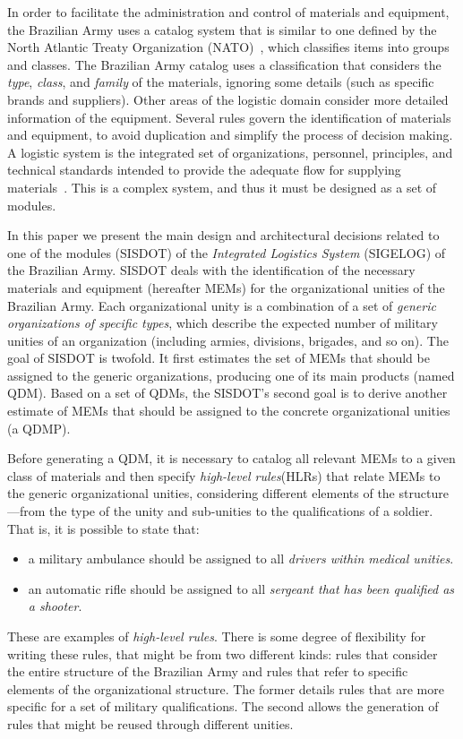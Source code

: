 \documentclass[AMA,STIX1COL,hidelinks]{WileyNJD-v2}
\newcommand{\callers}{\emph{high-level rules}\xspace}
\begin{document}
In order to facilitate the administration and control of materials and equipment, the Brazilian Army uses a catalog system that is similar to one defined by the North Atlantic Treaty Organization (NATO)~\cite{otan2012}, which classifies items into groups and classes. The Brazilian Army catalog uses a classification that considers the \emph{type}, \emph{class}, and \emph{family} of the materials, ignoring some details (such as specific brands and suppliers). Other areas of the logistic domain consider more detailed information of the equipment. Several rules govern the identification of materials and equipment, to avoid duplication and simplify the process of decision making. A logistic system is the integrated set of organizations, personnel, principles, and technical standards intended to provide the adequate flow for supplying materials~\cite{brasil2003}. This is a complex system, and thus it must be designed as a set of modules. 

In this paper we present the main design and architectural decisions related to one of the modules (SISDOT) of the \emph{Integrated Logistics System} (SIGELOG) of the Brazilian Army. SISDOT deals with the identification of the necessary materials and equipment (hereafter MEMs) for the organizational unities of the Brazilian Army. Each organizational unity is a combination of a set of \emph{generic organizations of specific types}, which describe the expected number of military unities of an organization (including armies, divisions, brigades, and so on). The goal of SISDOT is twofold. It first estimates the set of MEMs that should be assigned to the generic organizations, producing one of its main products (named QDM). Based on a set of QDMs, the SISDOT's second goal is to derive another estimate of MEMs that should be assigned to the concrete organizational unities (a QDMP). 

{\color{blue}
Before generating a QDM, it is necessary to catalog all relevant MEMs to a given class of materials and then specify \callers (HLRs) that relate MEMs to the generic organizational unities, considering different elements of the structure---from the type of the unity and sub-unities to the qualifications of a soldier. That is, it is possible to state that:

\begin{itemize}
 \item a military ambulance should be assigned to all \emph{drivers within medical unities}.
 \item an automatic rifle should be assigned to all \emph{sergeant that has been qualified as a shooter}.
\end{itemize}

These are examples of \callers. There is some degree of flexibility for writing these rules, that might be from two different kinds: rules that consider the entire structure of the Brazilian Army and rules that refer to specific elements of the organizational structure. The former details rules that are more specific for a set of military qualifications. The second allows the generation of rules that might be reused through different unities.}
\end{document}
